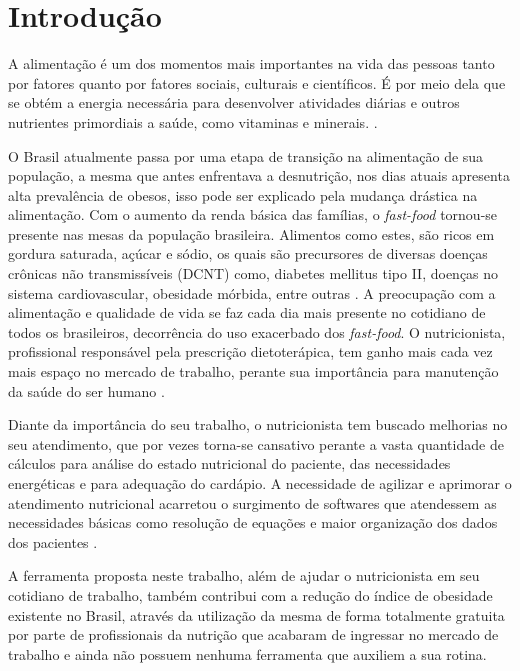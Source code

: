 \chapter{Introdução} 

A alimentação é um dos momentos mais importantes na vida das pessoas tanto
por fatores quanto por fatores sociais, culturais e científicos. É
por meio dela que se obtém a energia necessária para desenvolver atividades diárias
e outros nutrientes primordiais a saúde, como vitaminas e minerais. \cite{proenca}.

O Brasil atualmente passa por uma etapa de transição na alimentação de sua
população, a mesma que antes enfrentava a desnutrição, nos dias atuais apresenta
alta prevalência de obesos, isso pode ser explicado pela mudança drástica na
alimentação. Com o aumento da renda básica das famílias, o \textit{fast-food} tornou-se
presente nas mesas da população brasileira. Alimentos como estes, são ricos em
gordura saturada, açúcar e sódio, os quais são precursores de diversas doenças crônicas não
transmissíveis (DCNT) como, diabetes mellitus tipo II, doenças no sistema
cardiovascular, obesidade mórbida, entre outras \cite{schuster}.
A preocupação com a alimentação e qualidade de vida se faz cada
dia mais presente no cotidiano de todos os brasileiros, decorrência do uso exacerbado
dos \textit{fast-food}. O nutricionista, 
profissional responsável pela prescrição dietoterápica, tem ganho mais cada vez mais espaço no mercado de
trabalho, perante sua importância para manutenção da saúde do ser humano
\cite{brasil}.

Diante da importância do seu trabalho, o nutricionista tem buscado melhorias
no seu atendimento, que por vezes torna-se cansativo perante a vasta quantidade de
cálculos para análise do estado nutricional do paciente, das necessidades energéticas
e para adequação do cardápio. A necessidade de agilizar e aprimorar o atendimento
nutricional acarretou o surgimento de softwares que atendessem as necessidades
básicas como resolução de equações e maior organização dos dados dos pacientes
\cite{vieira}.

A ferramenta proposta neste trabalho, além de ajudar o nutricionista em seu cotidiano de trabalho,
também contribui com a redução do índice de obesidade existente no Brasil, através da utilização da mesma
de forma totalmente gratuita por parte de profissionais da nutrição que acabaram de ingressar no mercado
de trabalho e ainda não possuem nenhuma ferramenta que auxiliem a sua rotina.


